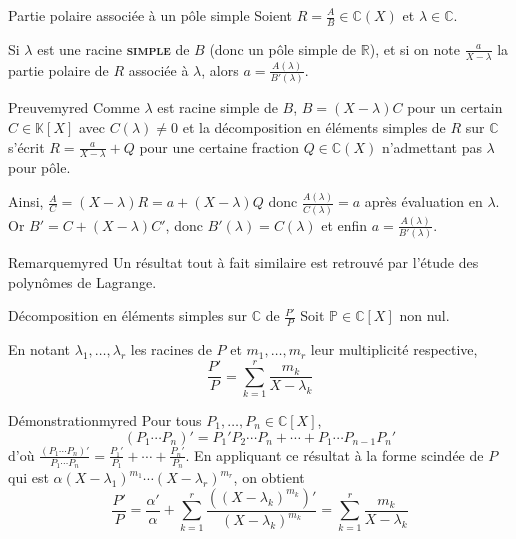     \begin{theo}{Partie polaire associée à un pôle simple}{}
        Soient $R = \frac{A}{B} \in \mathbb{C}(X)$ et $\lambda \in \mathbb{C}$.

        Si $\lambda$ est une racine \textbf{\textsc{simple}} de $B$ (donc un pôle simple de $\mathbb{R}$), et si on note $\frac{a}{X - \lambda}$ la partie polaire de $R$ associée à $\lambda$, alors $a = \frac{A(\lambda)}{B'(\lambda)}$.
    \end{theo}

    \begin{demo}{Preuve}{myred}
        Comme $\lambda$ est racine simple de $B$, $B = (X - \lambda) C$ pour un certain $C \in \mathbb{K}[X]$ avec $C(\lambda) \neq 0$ et la décomposition en éléments simples de $R$ sur $\mathbb{C}$ s’écrit $R = \frac{a}{X-\lambda} + Q$ pour une certaine fraction $Q \in \mathbb{C}(X)$ n’admettant pas $\lambda$ pour pôle. 

        Ainsi, $\frac{A}{C} = (X - \lambda) R = a + (X - \lambda)Q$ donc $\frac{A(\lambda)}{C(\lambda)} = a$ après évaluation en $\lambda$. Or $B' = C + (X - \lambda) C'$, donc $B'(\lambda) = C(\lambda)$ et enfin $a = \frac{A(\lambda)}{B'(\lambda)}$.
    \end{demo}

    \begin{omed}{Remarque}{myred}
        Un résultat tout à fait similaire est retrouvé par l’étude des polynômes de Lagrange.
    \end{omed}

    \begin{theo}{Décomposition en éléments simples sur $\mathbb{C}$ de $\frac{P'}{P}$}{}
        Soit $\mathbb{P} \in \mathbb{C}[X]$ non nul.
        
        En notant $\lambda_1,\ldots, \lambda_r$ les racines de $P$ et $m_1,\ldots,m_r$ leur multiplicité respective, 
        \[ \frac{P'}{P} = \sum_{k=1}^{r} \frac{m_k}{X - \lambda_k} \]
    \end{theo}

    \begin{demo}{Démonstration}{myred}
        Pour tous $P_1,\ldots,P_n \in \mathbb{C}[X]$, 
        \[ (P_1 \cdots P_n)' = P_1' P_2 \cdots P_n + \cdots + P_1 \cdots P_{n-1} P_n' \]    
        d’où $\frac{\left(P_1 \cdots P_n\right)'}{P_1 \cdots P_n} = \frac{P_1 '}{P_1} + \cdots + \frac{P_n'}{P_n}$. En appliquant ce résultat à la forme scindée de $P$ qui est $\alpha (X - \lambda_1)^{m_1} \cdots (X - \lambda_r)^{m_r}$, on obtient 
        \[ \frac{P'}{P} = \frac{\alpha'}{\alpha} + \sum_{k=1}^{r} \frac{\left((X-\lambda_k)^{m_k}\right)'}{(X - \lambda_k)^{m_k}} = \sum_{k = 1}^{r} \frac{m_k}{X - \lambda_k} \]
    \end{demo}

    

